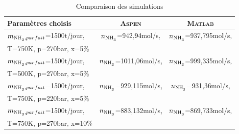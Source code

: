 \begin{table}[h!]
	\centering
	\begin{tabular}{l|c|c}
		Paramètres choisis & \textsc{Aspen} & \textsc{Matlab}\\
		\hline
		$m_{\ce{NH3}, parfait}$=1500t/jour, & $n_{\ce{NH3}}$=942,94mol/s, & $n_{\ce{NH3}}$=937,795mol/s,\\
		T=750K, p=270bar, x=5\%             &   &  \\
		\hline
		$m_{\ce{NH3}, parfait}$=1500t/jour, & $n_{\ce{NH3}}$=1011,06mol/s, & $n_{\ce{NH3}}$=999,335mol/s,\\
		T=500K, p=270bar, x=5\%             &   &  \\
		\hline
		$m_{\ce{NH3}, parfait}$=1500t/jour, & $n_{\ce{NH3}}$=929,115mol/s, & $n_{\ce{NH3}}$=931,36mol/s,\\
		T=750K, p=220bar, x=5\%             &   &  \\
		\hline
		$m_{\ce{NH3}, parfait}$=1500t/jour, & $n_{\ce{NH3}}$=883,132mol/s, & $n_{\ce{NH3}}$=869,733mol/s,\\
		T=750K, p=270bar, x=10\%             &   &  \\
		\hline

	\end{tabular}
	\caption{Comparaison des simulations}
	\label{tab:sim}
\end{table}


